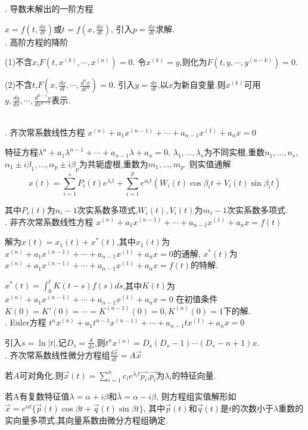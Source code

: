 \documentclass[UTF8]{ctexart}
\begin{document}
. 导数未解出的一阶方程 \par
$x=f(t,\frac{dx}{dt})$或$t=f(x,\frac{dx}{dt})$,
引入$p=\frac{dx}{dt}$求解.
~\\


. 高阶方程的降阶 \par
(1)不含$x$,$F\left(t, x^{(k)}, \cdots, x^{(n)}\right)=0$.
令$x^{(k)}=y$,则化为$F\left(t, y, \cdots, y^{(n-k)}\right)=0 $.\par
(2)不含$t$,$F\left(x, \frac{d x}{d t}, \cdots, \frac{d^{n} x}{d t^{n}}\right)=0$.
引入$y=\frac{dx}{dt}$,以$x$为新自变量.则$x^{(k)}$可用$y,\frac{dy}{dx},\cdots,\frac{d^{k-1}y}{dx^{k-1}}$表示.\par
~\\

. 齐次常系数线性方程
$x^{(n)}+a_1x^{(n-1)}+\cdots +a_{n-1}x^{(1)}+a_nx=0$ \par
特征方程$\lambda ^{n}+a_1\lambda^{n-1}+\cdots +a_{n-1}\lambda+a_n=0$.
$\lambda_1,\dots ,\lambda_s$为不同实根,重数$n_1,\dots ,n_s$,
$\alpha_1 \pm i\beta_1,\dots ,\alpha_p \pm i\beta_p$为共轭虚根,重数为$m_1,\dots ,m_p$.
则实值通解$$x(t)=\sum_{i=1}^s P_i(t)e^{\lambda_i t} + \sum_{i=1}^p e^{\alpha_i t}(W_i(t)\cos \beta_i t +V_i(t) \sin\beta_i t)$$ \par
其中$P_i(t)$为$n_i-1$次实系数多项式,$W_i(t),V_i(t)$为$m_i-1$次实系数多项式.
~\\

. 非齐次常系数线性方程
$x^{(n)}+a_1x^{(n-1)}+\cdots +a_{n-1}x^{(1)}+a_nx=f(t)$ \par
解为$x(t)=x_1(t)+x^*(t)$,其中$x_1(t)$为$x^{(n)}+a_1x^{(n-1)}+\cdots +a_{n-1}x^{(1)}+a_nx=0$的通解,
$x^*(t)$为$x^{(n)}+a_1x^{(n-1)}+\cdots +a_{n-1}x^{(1)}+a_nx=f(t)$的特解. \par
$x^*(t)=\int _0^t K(t-s)f(s)ds$,其中$K(t)$为$x^{(n)}+a_1x^{(n-1)}+\cdots +a_{n-1}x^{(1)}+a_nx=0$
在初值条件$K(0)=K'(0)=\cdots =K^{(n-1)}(0)=0, K^{(n)}(0)=1$下的解.
~\\

. Euler方程
$t^nx^{(n)}+a_1t^{n-1}x^{(n-1)}+\cdots +a_{n-1}tx^{(1)}+a_nx=0$ \par
引入$s=\ln |t|$,记$D_s=\frac{d}{ds}$,则$t^n x^{(n)}=D_s(D_s-1)\cdots (D_s-n+1)x$.
~\\

. 齐次常系数线性微分方程组$\frac{d\vec{x}}{dt}=A\vec{x} $ \par

若$A$可对角化,则$\vec{x}(t)=\sum _{i=1}^n c_i e^{\lambda_i t}\vec{p_i}$,$\vec{p_i}$为$\lambda_i$的特征向量. \par
若A有复数特征值$\lambda=\alpha+i\beta$和$\bar{\lambda}=\alpha-i\beta$,
则方程组实值解形如$\vec{x}=e^{\alpha t}\{\vec{p}(t) \cos \beta t+\vec{q}(t) \sin \beta t\}$,
其中$\vec{p}(t)$和$\vec{q}(t)$是$t$的次数小于$\lambda$重数的实向量多项式,其向量系数由微分方程组确定. \par
\end{document}
